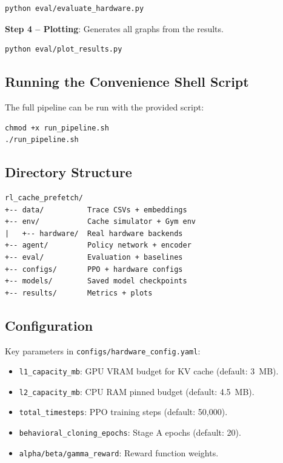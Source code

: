\documentclass[conference]{IEEEtran}
\begin{document}
\begin{verbatim}
python eval/evaluate_hardware.py
\end{verbatim}

\textbf{Step 4 – Plotting}: Generates all graphs from the results.

\begin{verbatim}
python eval/plot_results.py
\end{verbatim}

\subsection{Running the Convenience Shell Script}

The full pipeline can be run with the provided script:

\begin{verbatim}
chmod +x run_pipeline.sh
./run_pipeline.sh
\end{verbatim}

\subsection{Directory Structure}

\begin{verbatim}
rl_cache_prefetch/
+-- data/          Trace CSVs + embeddings
+-- env/           Cache simulator + Gym env
|   +-- hardware/  Real hardware backends
+-- agent/         Policy network + encoder
+-- eval/          Evaluation + baselines
+-- configs/       PPO + hardware configs
+-- models/        Saved model checkpoints
+-- results/       Metrics + plots
\end{verbatim}


\subsection{Configuration}

Key parameters in \texttt{configs/hardware\_config.yaml}:

\begin{itemize}
    \item \texttt{l1\_capacity\_mb}: GPU VRAM budget for KV cache (default: 3~MB).
    \item \texttt{l2\_capacity\_mb}: CPU RAM pinned budget (default: 4.5~MB).
    \item \texttt{total\_timesteps}: PPO training steps (default: 50,000).
    \item \texttt{behavioral\_cloning\_epochs}: Stage A epochs (default: 20).
    \item \texttt{alpha/beta/gamma\_reward}: Reward function weights.
\end{itemize}
\end{document}
